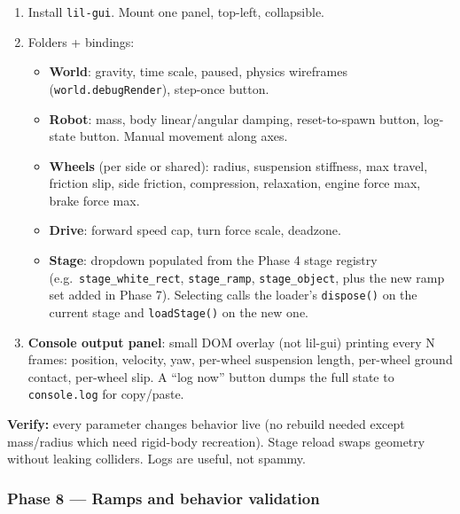\documentclass[
]{article}
\providecommand{\tightlist}{%
  \setlength{\itemsep}{0pt}\setlength{\parskip}{0pt}}
\begin{document}
\begin{enumerate}
\def\labelenumi{\arabic{enumi}.}
\tightlist
\item
  Install \texttt{lil-gui}. Mount one panel, top-left, collapsible.
\item
  Folders + bindings:

  \begin{itemize}
  \tightlist
  \item
    \textbf{World}: gravity, time scale, paused, physics wireframes
    (\texttt{world.debugRender}), step-once button.
  \item
    \textbf{Robot}: mass, body linear/angular damping, reset-to-spawn
    button, log-state button. Manual movement along axes.
  \item
    \textbf{Wheels} (per side or shared): radius, suspension stiffness,
    max travel, friction slip, side friction, compression, relaxation,
    engine force max, brake force max.
  \item
    \textbf{Drive}: forward speed cap, turn force scale, deadzone.
  \item
    \textbf{Stage}: dropdown populated from the Phase 4 stage registry
    (e.g.~\texttt{stage\_white\_rect}, \texttt{stage\_ramp},
    \texttt{stage\_object}, plus the new ramp set added in Phase 7).
    Selecting calls the loader's \texttt{dispose()} on the current stage
    and \texttt{loadStage()} on the new one.
  \end{itemize}
\item
  \textbf{Console output panel}: small DOM overlay (not lil-gui)
  printing every N frames: position, velocity, yaw, per-wheel suspension
  length, per-wheel ground contact, per-wheel slip. A ``log now'' button
  dumps the full state to \texttt{console.log} for copy/paste.
\end{enumerate}

\textbf{Verify:} every parameter changes behavior live (no rebuild
needed except mass/radius which need rigid-body recreation). Stage
reload swaps geometry without leaking colliders. Logs are useful, not
spammy.

\subsubsection{Phase 8 --- Ramps and behavior
validation}\label{phase-8-ramps-and-behavior-validation}
\end{document}
